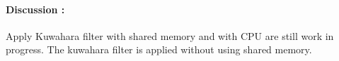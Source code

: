 \documentclass{article}
\begin{document}
\begin{figure}[H]
\end{figure}

\paragraph{Discussion :} Apply Kuwahara filter with shared memory and with CPU are still work in progress. The kuwahara filter is applied without using shared memory.
\end{document}
